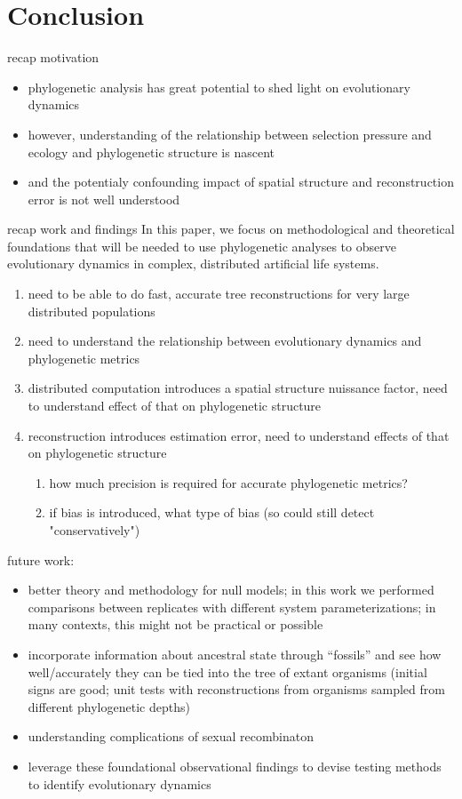 \section{Conclusion} \label{sec:conclusion}

recap motivation
\begin{itemize}
    \item phylogenetic analysis has great potential to shed light on evolutionary dynamics
    \item however, understanding of the relationship between selection pressure and ecology and phylogenetic structure is nascent
    \item   and the potentialy confounding impact of spatial structure and reconstruction error is not well understood
\end{itemize}

recap work and findings
In this paper, we focus on methodological and theoretical foundations that will be needed to use phylogenetic analyses to observe evolutionary dynamics in complex, distributed artificial life systems.
\begin{enumerate}
    \item need to be able to do fast, accurate tree reconstructions for very large distributed populations
    \item need to understand the relationship between evolutionary dynamics and phylogenetic metrics 
    \item distributed computation introduces a spatial structure nuissance factor, need to understand effect of that on phylogenetic structure
    \item reconstruction introduces estimation error, need to understand effects of that on phylogenetic structure
    \begin{enumerate}
        \item how much precision is required for accurate phylogenetic metrics?
        \item if bias is introduced, what type of bias (so could still detect "conservatively")
    \end{enumerate}
    \end{enumerate}

future work:
\begin{itemize}
    \item better theory and methodology for null models; in this work we performed comparisons between replicates with different system parameterizations; in many contexts, this might not be practical or possible
    \item  incorporate information about ancestral state through ``fossils'' and see how well/accurately they can be tied into the tree of extant organisms (initial signs are good; unit tests with reconstructions from organisms sampled from different phylogenetic depths)
    \item  understanding complications of sexual recombinaton
    \item leverage these foundational observational findings to devise testing methods to identify evolutionary dynamics
\end{itemize}

